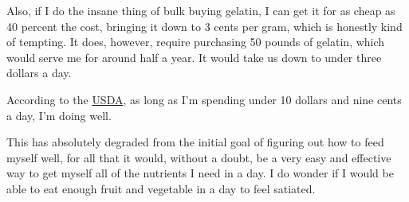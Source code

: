 \documentclass[12pt]{article}[titlepage]
\renewcommand{\,}{\textsuperscript{,}}
\begin{document}
Also, if I do the insane thing of bulk buying gelatin, I can get it for as cheap as 40 percent the cost, bringing it down to 3 cents per gram, which is honestly kind of tempting. It does, however, require purchasing 50 pounds of gelatin, which would serve me for around half a year.  
It would take us down to under three dollars a day.

According to the \href{https://www.fns.usda.gov/research/cnpp/usda-food-plans/cost-food-monthly-reports}{USDA}, as long as I'm spending under 10 dollars and nine cents a day, I'm doing well.

This has absolutely degraded from the initial goal of figuring out how to feed myself well, for all that it would, without a doubt, be a very easy and effective way to get myself all of the nutrients I need in a day.  
I do wonder if I would be able to eat enough fruit and vegetable in a day to feel satiated.  
\end{document}
